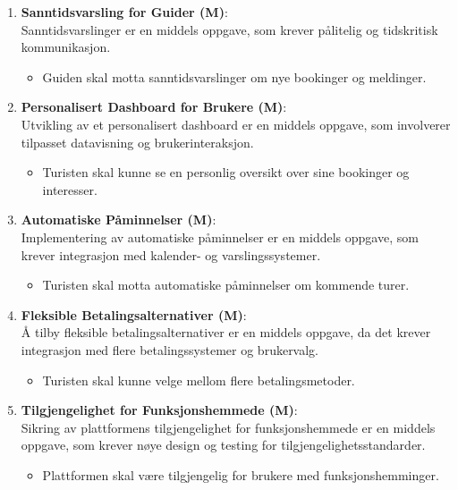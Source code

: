 \documentclass[../doc.tex]{subfiles}
\begin{document}
\begin{enumerate}
    \item \textbf{Sanntidsvarsling for Guider (M)}: \\
    Sanntidsvarslinger er en middels oppgave, som krever pålitelig og tidskritisk kommunikasjon.
    \begin{itemize}
        \item Guiden skal motta sanntidsvarslinger om nye bookinger og meldinger.
    \end{itemize}

    \item \textbf{Personalisert Dashboard for Brukere (M)}: \\
    Utvikling av et personalisert dashboard er en middels oppgave, som involverer tilpasset datavisning og brukerinteraksjon.
    \begin{itemize}
        \item Turisten skal kunne se en personlig oversikt over sine bookinger og interesser.
    \end{itemize}

    \item \textbf{Automatiske Påminnelser (M)}: \\
    Implementering av automatiske påminnelser er en middels oppgave, som krever integrasjon med kalender- og varslingssystemer.
    \begin{itemize}
        \item Turisten skal motta automatiske påminnelser om kommende turer.
    \end{itemize}

    \item \textbf{Fleksible Betalingsalternativer (M)}: \\
    Å tilby fleksible betalingsalternativer er en middels oppgave, da det krever integrasjon med flere betalingssystemer og brukervalg.
    \begin{itemize}
        \item Turisten skal kunne velge mellom flere betalingsmetoder.
    \end{itemize}

    \item \textbf{Tilgjengelighet for Funksjonshemmede (M)}: \\
    Sikring av plattformens tilgjengelighet for funksjonshemmede er en middels oppgave, som krever nøye design og testing for tilgjengelighetsstandarder.
    \begin{itemize}
        \item Plattformen skal være tilgjengelig for brukere med funksjonshemminger.
    \end{itemize}


\end{enumerate}
\end{document}
